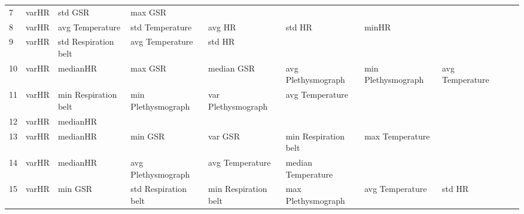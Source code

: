 \begin{landscape}
\begin{table}[]
\begin{tabular}{l|llllllll}
7        & varHR                   & std GSR                 & max GSR                 &                         &                         &                       &                         &                         &                         &         \\
8        & varHR                   & avg Temperature         & std Temperature         & avg HR                  & std HR                  & minHR                 &                         &                         &                         &         \\
9        & varHR                   & std Respiration belt    & avg Temperature         & std HR                  &                         &                       &                         &                         &                         &         \\
10       & varHR                   & medianHR                & max GSR                 & median GSR              & avg Plethysmograph      & min Plethysmograph    & avg Temperature         &                         &                         &         \\
11       & varHR                   & min Respiration belt    & min Plethysmograph      & var Plethysmograph      & avg Temperature         &                       &                         &                         &                         &         \\
12       & varHR                   & medianHR                &                         &                         &                         &                       &                         &                         &                         &         \\
13       & varHR                   & medianHR                & min GSR                 & var GSR                 & min Respiration belt    & max Temperature       &                         &                         &                         &         \\
14       & varHR                   & medianHR                & avg Plethysmograph      & avg Temperature         & median Temperature      &                       &                         &                         &                         &         \\
15       & varHR                   & min GSR                 & std Respiration belt    & min Respiration belt    & max Plethysmograph      & avg Temperature       & std HR                  &                         &                         &         \\

\end{tabular}
\end{table}
\end{landscape}
